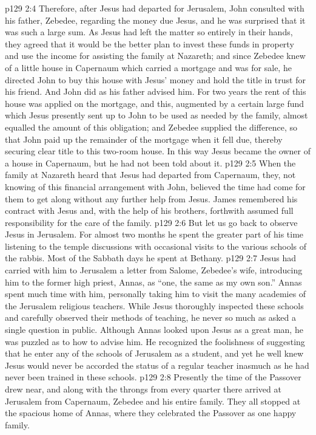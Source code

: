 \vs p129 2:4 Therefore, after Jesus had departed for Jerusalem, John consulted with his father, Zebedee, regarding the money due Jesus, and he was surprised that it was such a large sum. As Jesus had left the matter so entirely in their hands, they agreed that it would be the better plan to invest these funds in property and use the income for assisting the family at Nazareth; and since Zebedee knew of a little house in Capernaum which carried a mortgage and was for sale, he directed John to buy this house with Jesus’ money and hold the title in trust for his friend. And John did as his father advised him. For two years the rent of this house was applied on the mortgage, and this, augmented by a certain large fund which Jesus presently sent up to John to be used as needed by the family, almost equalled the amount of this obligation; and Zebedee supplied the difference, so that John paid up the remainder of the mortgage when it fell due, thereby securing clear title to this two\hyp{}room house. In this way Jesus became the owner of a house in Capernaum, but he had not been told about it.
\vs p129 2:5 \pc When the family at Nazareth heard that Jesus had departed from Capernaum, they, not knowing of this financial arrangement with John, believed the time had come for them to get along without any further help from Jesus. James remembered his contract with Jesus and, with the help of his brothers, forthwith assumed full responsibility for the care of the family.
\vs p129 2:6 \pc But let us go back to observe Jesus in Jerusalem. For almost two months he spent the greater part of his time listening to the temple discussions with occasional visits to the various schools of the rabbis. Most of the Sabbath days he spent at Bethany.
\vs p129 2:7 Jesus had carried with him to Jerusalem a letter from Salome, Zebedee’s wife, introducing him to the former high priest, Annas, as “one, the same as my own son.” Annas spent much time with him, personally taking him to visit the many academies of the Jerusalem religious teachers. While Jesus thoroughly inspected these schools and carefully observed their methods of teaching, he never so much as asked a single question in public. Although Annas looked upon Jesus as a great man, he was puzzled as to how to advise him. He recognized the foolishness of suggesting that he enter any of the schools of Jerusalem as a student, and yet he well knew Jesus would never be accorded the status of a regular teacher inasmuch as he had never been trained in these schools.
\vs p129 2:8 Presently the time of the Passover drew near, and along with the throngs from every quarter there arrived at Jerusalem from Capernaum, Zebedee and his entire family. They all stopped at the spacious home of Annas, where they celebrated the Passover as one happy family.
